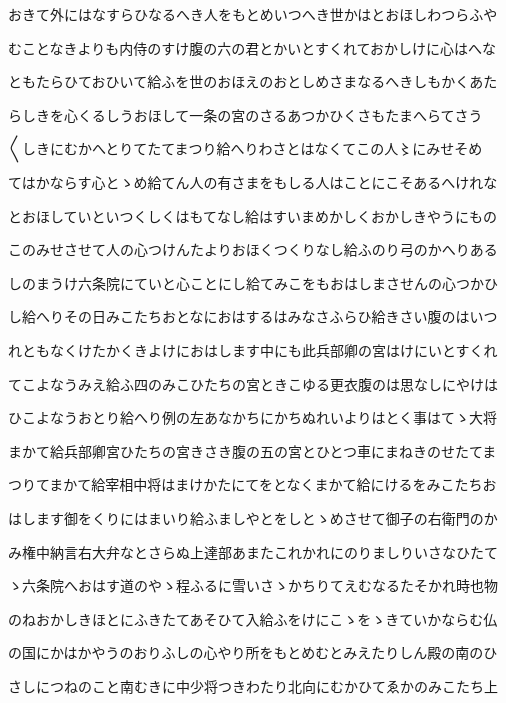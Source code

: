 \documentclass[a4paper,11pt,landscape]{ltjtarticle}
\begin{document}
おきて外にはなすらひなるへき人をもとめいつへき世かはとおほしわつらふや
\par\medskip
むことなきよりも内侍のすけ腹の六の君とかいとすくれておかしけに心はへな
\par\medskip
ともたらひておひいて給ふを世のおほえのおとしめさまなるへきしもかくあた
\par\medskip
らしきを心くるしうおほして一条の宮のさるあつかひくさもたまへらてさう
\par\medskip
〱しきにむかへとりてたてまつり給へりわさとはなくてこの人〻にみせそめ
\par\medskip
てはかならす心とゝめ給てん人の有さまをもしる人はことにこそあるへけれな
\par\medskip
とおほしていといつくしくはもてなし給はすいまめかしくおかしきやうにもの
\par\medskip
このみせさせて人の心つけんたよりおほくつくりなし給ふのり弓のかへりある
\par\medskip
しのまうけ六条院にていと心ことにし給てみこをもおはしまさせんの心つかひ
\par\medskip
し給へりその日みこたちおとなにおはするはみなさふらひ給きさい腹のはいつ
\par\medskip
れともなくけたかくきよけにおはします中にも此兵部卿の宮はけにいとすくれ
\par\medskip
てこよなうみえ給ふ四のみこひたちの宮ときこゆる更衣腹のは思なしにやけは
\par\medskip
ひこよなうおとり給へり例の左あなかちにかちぬれいよりはとく事はてゝ大将
\par\medskip
まかて給兵部卿宮ひたちの宮きさき腹の五の宮とひとつ車にまねきのせたてま
\par\medskip
つりてまかて給宰相中将はまけかたにてをとなくまかて給にけるをみこたちお
\par\medskip
はします御をくりにはまいり給ふましやとをしとゝめさせて御子の右衛門のか
\par\medskip
み権中納言右大弁なとさらぬ上達部あまたこれかれにのりましりいさなひたて
\par\medskip
ゝ六条院へおはす道のやゝ程ふるに雪いさゝかちりてえむなるたそかれ時也物
\par\medskip
のねおかしきほとにふきたてあそひて入給ふをけにこゝをゝきていかならむ仏
\par\medskip
の国にかはかやうのおりふしの心やり所をもとめむとみえたりしん殿の南のひ
\par\medskip
さしにつねのこと南むきに中少将つきわたり北向にむかひてゑかのみこたち上
\par\medskip
\end{document}
